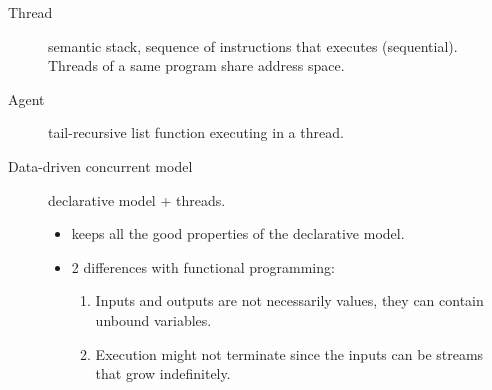 \begin{description}
  \item[Thread] semantic stack, sequence of instructions that executes (sequential).
    Threads of a same program share address space.
  \item[Agent] tail-recursive list function executing in a thread.
  \item[Data-driven concurrent model] declarative model + threads.
    \begin{itemize}
      \item keeps all the good properties of the declarative model.
      \item 2 differences with functional programming:
        \begin{enumerate}
          \item Inputs and outputs are not necessarily values, they can contain unbound variables.
          \item Execution might not terminate since the inputs can be streams that grow indefinitely.
        \end{enumerate}
    \end{itemize}


\end{description}
